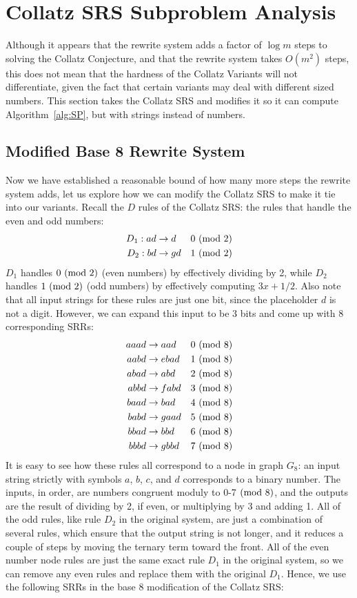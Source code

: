 \section{Collatz SRS Subproblem Analysis} \label{subsec:collatzsubproblemananalysis}
Although it appears that the rewrite system adds a factor of $\log{m}$ steps to solving the Collatz Conjecture, and that the rewrite system takes $O(m^2)$ steps, this does not mean that the hardness of the Collatz Variants will not differentiate, given the fact that certain variants may deal with different sized numbers. This section takes the Collatz SRS and modifies it so it can compute Algorithm~\ref{alg:SP}, but with strings instead of numbers.
\subsection{Modified Base 8 Rewrite System} \label{subsec:base8rewrite}
Now we have established a reasonable bound of how many more steps the rewrite system adds, let us explore how we can modify the Collatz SRS to make it tie into our variants. Recall the $D$ rules of the Collatz SRS: the rules that handle the even and odd numbers:
\begin{align*}
    D_1: ad &\rightarrow d &\text{$0\ (\mathrm{mod}\ 2)$}\\
    D_2: bd &\rightarrow gd &\text{$1\ (\mathrm{mod}\ 2)$}\\
\end{align*}
$D_1$ handles $0 \ (\mathrm{mod}\ 2)$ (even numbers) by effectively dividing by 2, while $D_2$ handles $1 \ (\mathrm{mod}\ 2)$ (odd numbers)  by effectively computing $3x+1/2$. Also note that all input strings for these rules are just one bit, since the placeholder $d$ is not a digit. However, we can expand this input to be 3 bits and come up with 8 corresponding SRRs:
\begin{align*}
    aaad &\rightarrow aad &\text{$0\ (\mathrm{mod}\ 8)$}\\
    aabd &\rightarrow ebad &\text{$1\ (\mathrm{mod}\ 8)$}\\
    abad &\rightarrow abd &\text{$2\ (\mathrm{mod}\ 8)$}\\
    abbd &\rightarrow fabd &\text{$3\ (\mathrm{mod}\ 8)$}\\
    baad &\rightarrow bad &\text{$4\ (\mathrm{mod}\ 8)$}\\
    babd &\rightarrow gaad &\text{$5\ (\mathrm{mod}\ 8)$}\\
    bbad &\rightarrow bbd &\text{$6\ (\mathrm{mod}\ 8)$}\\
    bbbd &\rightarrow gbbd &\text{$7\ (\mathrm{mod}\ 8)$}
\end{align*}
It is easy to see how these rules all correspond to a node in graph $G_8$: an input string strictly with symbols $a$, $b$, $c$, and $d$ corresponds to a binary number. The inputs, in order, are numbers congruent moduly to 0-7$\ (\mathrm{mod}\ 8)$, and the outputs are the result of dividing by 2, if even, or multiplying by 3 and adding 1. All of the odd rules, like rule $D_2$ in the original system, are just a combination of several rules, which ensure that the output string is not longer, and it reduces a couple of steps by moving the ternary term toward the front. All of the even number node rules are just the same exact rule $D_1$ in the original system, so we can remove any even rules and replace them with the original $D_1$. Hence, we use the following SRRs in the base 8 modification of the Collatz SRS:
